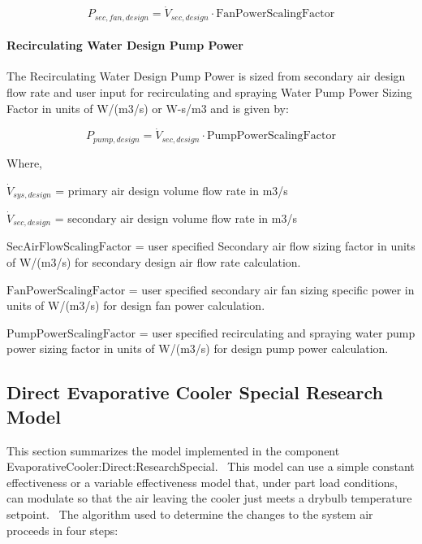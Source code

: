 \begin{equation}
P_{sec,fan,design} = \dot{V}_{sec,design}\cdot\text{FanPowerScalingFactor}
\end{equation}

\paragraph{Recirculating Water Design Pump Power}\label{recirculating-water-design-pump-power}

The Recirculating Water Design Pump Power is sized from secondary air design flow rate and user input for recirculating and spraying Water Pump Power Sizing Factor in units of W/(m3/s) or W-s/m3 and is given by:

\begin{equation}
P_{pump,design} = \dot{V}_{sec,design}\cdot\text{PumpPowerScalingFactor}
\end{equation}

Where,

\(\dot{V}_{sys,design}\) = primary air design volume flow rate in m3/s

\(\dot{V}_{sec,design}\) = secondary air design volume flow rate in m3/s

\(\text{SecAirFlowScalingFactor}\) = user specified Secondary air flow sizing factor in units of W/(m3/s) for secondary design air flow rate calculation.

\(\text{FanPowerScalingFactor}\) = user specified secondary air fan sizing specific power in units of W/(m3/s) for design fan power calculation.

\(\text{PumpPowerScalingFactor}\) = user specified recirculating and spraying water pump power sizing factor in units of W/(m3/s) for design pump power calculation.

\subsection{Direct Evaporative Cooler Special Research Model}\label{direct-evaporative-cooler-special-research-model}

This section summarizes the model implemented in the component EvaporativeCooler:Direct:ResearchSpecial.~ This model can use a simple constant effectiveness or a variable effectiveness model that, under part load conditions, can modulate so that the air leaving the cooler just meets a drybulb temperature setpoint.~ The algorithm used to determine the changes to the system air proceeds in four steps:

